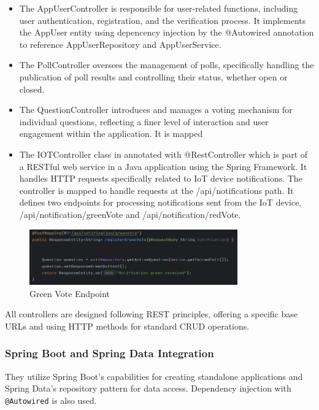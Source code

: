 \begin{itemize}
    \item The AppUserController is responsible for user-related functions, including user authentication, registration, and the verification process.  It implements the AppUser entity using depencency injection by the @Autowired annotation to reference AppUserRepository and AppUserService. 
    \item The PollController oversees the management of polls, specifically handling the publication of poll results and controlling their status, whether open or closed.
    \item The QuestionController introduces and manages a voting mechanism for individual questions, reflecting a finer level of interaction and user engagement within the application.  It is mapped 
    \item The IOTController class in annotated with @RestController which is part of a RESTful web service in a Java application using the Spring Framework. It handles HTTP requests specifically related to IoT device notifications.  The controller is mapped to handle requests at the /api/notifications path.  It defines two endpoints for processing notifications sent from the IoT device, /api/notification/greenVote and /api/notification/redVote.  
\end{itemize}

\begin{figure}[h]
  \centering
  \includegraphics[width=0.80\textwidth]{figs/green_vote.png}
  \caption{Green Vote Endpoint}
  \label{fig:my_label}
\end{figure}

\noindent All controllers are designed following REST principles, offering a specific base URLs and using HTTP methods for standard CRUD operations.

\subsubsection{Spring Boot and Spring Data Integration}
They utilize Spring Boot's capabilities for creating standalone applications and Spring Data's repository pattern for data access. Dependency injection with \texttt{@Autowired} is also used.

